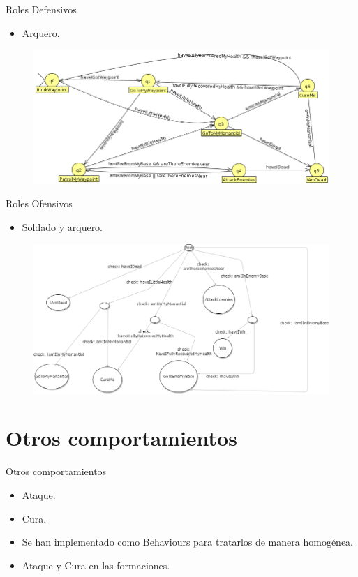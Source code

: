 \documentclass[10pt]{beamer}
\begin{document}
\begin{frame}{Roles Defensivos}
\begin{itemize}[<+- | alert@+>]
	\item Arquero.
\end{itemize}
\begin{figure}[!th]
	\includegraphics[scale=0.38]{images/defensive-archer}
\end{figure}
\end{frame}

\begin{frame}{Roles Ofensivos}
\begin{itemize}[<+- | alert@+>]
	\item Soldado y arquero.
\end{itemize}
\begin{figure}[!th]
	\includegraphics[scale=0.35]{images/arbolDecisionOfensivo}
\end{figure}
\end{frame}


\section{Otros comportamientos}
\begin{frame}{Otros comportamientos}
\begin{itemize}[<+- | alert@+>]
	\item Ataque.
	\item Cura.
	\item Se han implementado como Behaviours para tratarlos de manera homogénea.
	\item Ataque y Cura en las formaciones.
\end{itemize}
\end{frame}
\end{document}
